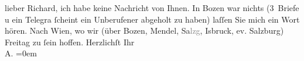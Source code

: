 \begin{ledgroupsized}[t]{13cm}
           \pstart
           {\pb}lieber Richard, ich habe keine Nachricht von Ihnen. In Bozen war nichts (3 Briefe u ein Telegra{\geminationm} ſcheint ein Unberufener abgeholt zu haben) laſſen Sie
               mich ein Wort hören. Nach Wien, wo wir (über Bozen, Mendel, Sa\textcolor{gray}{lzg}, I{\geminationn}sbruck, ev. Salzburg) Freitag zu ſein hoffen. \pend
           \pstart
           Herzlichſt Ihr{\\[\baselineskip]}\spacefill\mbox{A.}\pend
           \leftskip=0em{}
         
         \endnumbering{}\end{ledgroupsized}  \newcommand{\dateiname}{L01706}\newcommand{\titel}{Arthur Schnitzler an Richard Beer-Hofmann, 9. 9. 1907}\newcommand{\editorInnen}{Martin Anton Müller und Gerd-Hermann Susen}
      